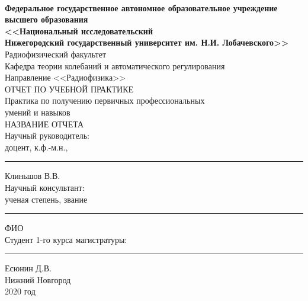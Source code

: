 \begin{titlepage}
	\fontsize{13pt}{13pt} \selectfont
	{\centering
	\linespread{1}
	\\[13pt]
		{\fontsize{13pt}{13pt} \selectfont\bf  Федеральное государственное автономное образовательное учреждение \\
		высшего образования \\
		<<Национальный исследовательский \\ Нижегородский
		государственный университет им. Н.И. Лобачевского>>
		}\\[12pt] 
	{\fontsize{13pt}{13pt} \selectfont
	Радиофизический факультет\\
	Кафедра теории колебаний и автоматического регулирования\\[28pt]
	Направление <<Радиофизика>>\\
	\vspace{30pt}
	ОТЧЕТ ПО УЧЕБНОЙ ПРАКТИКЕ\\}
	\vspace{15pt}
	{\fontsize{15pt}{15pt}
	Практика по получению первичных профессиональных\\
	умений и навыков
	\vspace{15pt}
	}\\
	{\fontsize{13pt}{13pt}
		НАЗВАНИЕ ОТЧЕТА
	}\\
	\vspace{48pt}}\fontsize{12pt}{12pt} \selectfont
	\noindent
	Научный руководитель:\\[0.4em]
	доцент, к.ф.-м.н.,\hfill \rule{2cm}{1pt} Клиньшов В.В. \hphantom{,}\\[40pt]
	Научный консультант:\\[0.4em]
	ученая степень, звание\hfill \rule{2cm}{1pt} ФИО\hphantom{aaaaaaaaaa,}\\[50pt]
	Студент 1-го курса магистратуры:
	\hfill \rule{2cm}{1pt} Есюнин Д.В. \hphantom{aa,}\\[30pt]
	\vfill
	\centering
	Нижний Новгород\\[0.4em]
	2020 год
\end{titlepage}
\clearpage
\restoregeometry